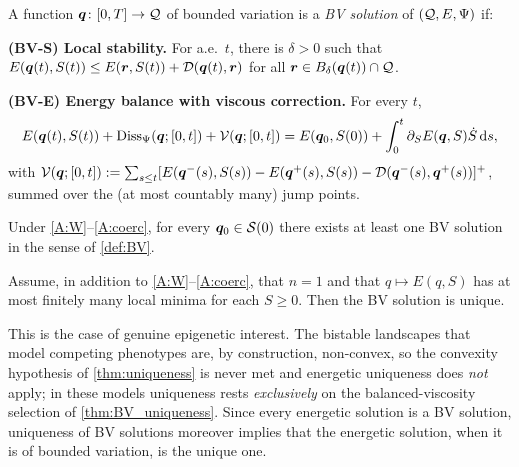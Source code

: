 \begin{definition}\label{def:BV}
A function $\bm{q}\colon[0,T]\to\mathcal{Q}$ of bounded variation is a
\emph{BV solution} of $(\mathcal{Q},E,\Psi)$ if:

\smallskip
\noindent\textbf{(BV-S) Local stability.} For a.e.\ $t$, there is
$\delta>0$ such that $E(\bm{q}(t),S(t))\le E(\bm{r},S(t))+\mathcal{D}(\bm{q}(t),\bm{r})$
for all $\bm{r}\in B_\delta(\bm{q}(t))\cap\mathcal{Q}$.

\smallskip
\noindent\textbf{(BV-E) Energy balance with viscous correction.}
For every $t$,
\begin{equation}\label{eq:BV_energy}
  E(\bm{q}(t),S(t))+\mathrm{Diss}_\Psi(\bm{q};[0,t])+\mathcal V(\bm{q};[0,t])
  = E(\bm{q}_0,S(0))+\int_0^t\partial_S E(\bm{q},S)\dot S\mathop{}\!\mathrm{d} s,
\end{equation}
with $\mathcal V(\bm{q};[0,t]):=\sum_{s\le t}
[E(\bm{q}^-(s),S(s))-E(\bm{q}^+(s),S(s))-\mathcal{D}(\bm{q}^-(s),\bm{q}^+(s))]^+$,
summed over the (at most countably many) jump points.
\end{definition}

\begin{theorem}\label{thm:BV_existence}
Under \ref{A:W}--\ref{A:coerc}, for every $\bm{q}_0\in\mathcal S(0)$
there exists at least one BV solution in the sense of \cref{def:BV}.
\end{theorem}

\begin{theorem}\label{thm:BV_uniqueness}
Assume, in addition to \ref{A:W}--\ref{A:coerc}, that $n=1$ and that
$q\mapsto E(q,S)$ has at most finitely many local minima for each
$S\ge0$. Then the BV solution is unique.
\end{theorem}

This is the case of genuine epigenetic interest. The bistable
landscapes that model competing phenotypes are, by construction,
non-convex, so the convexity hypothesis of \cref{thm:uniqueness} is
never met and energetic uniqueness does \emph{not} apply; in these
models uniqueness rests \emph{exclusively} on the balanced-viscosity
selection of \cref{thm:BV_uniqueness}. Since every energetic solution is
a BV solution, uniqueness of BV solutions moreover implies that the
energetic solution, when it is of bounded variation, is the unique one.
